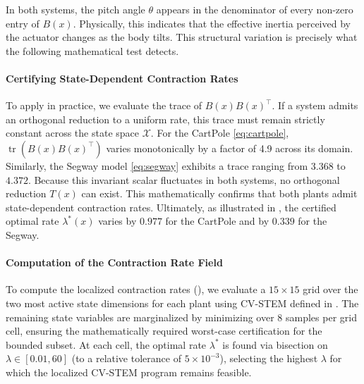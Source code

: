 \documentclass[lettersize,journal]{IEEEtran}
\newtheorem{remark}{Remark}
\begin{document}
In both systems, the pitch angle $\theta$ appears in the denominator of every non-zero entry of $B(x)$. Physically, this indicates that the effective inertia perceived by the actuator changes as the body tilts. This structural variation is precisely what the following mathematical test detects.

\paragraph{Certifying State-Dependent Contraction Rates}
To apply  in practice, we evaluate the trace of $B(x)B(x)^\top$. If a system admits an orthogonal reduction to a uniform rate, this trace must remain strictly constant across the state space $\mathcal{X}$. For the CartPole \eqref{eq:cartpole}, $\operatorname{tr}(B(x)B(x)^\top)$ varies monotonically by a factor of 4.9 across its domain. Similarly, the Segway model \eqref{eq:segway} exhibits a trace ranging from $3.368$ to $4.372$. Because this invariant scalar fluctuates in both systems, no orthogonal reduction $T(x)$ can exist. This mathematically confirms that both plants admit state-dependent contraction rates. Ultimately, as illustrated in , the certified optimal rate $\lambda^*(x)$ varies by $0.977$ for the CartPole and by $0.339$ for the Segway.


\paragraph{Computation of the Contraction Rate Field}
To compute the localized contraction rates (), we evaluate a $15\times15$ grid over the two most active state dimensions for each plant using CV-STEM defined in . The remaining state variables are marginalized by minimizing over 8 samples per grid cell, ensuring the mathematically required worst-case certification for the bounded subset. 
At each cell, the optimal rate $\lambda^*$ is found via bisection on $\lambda\in[0.01, 60]$ (to a relative tolerance of $5\times10^{-3}$), selecting the highest $\lambda$ for which the localized CV-STEM program remains feasible.
\end{document}
